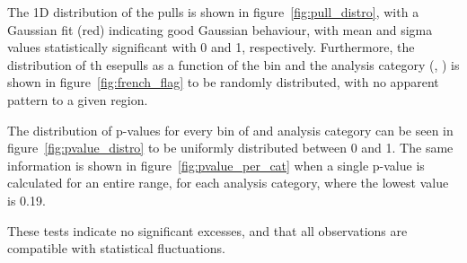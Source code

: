 The 1D distribution of the
pulls is shown in figure~\ref{fig:pull_distro}, with a Gaussian fit (red)
indicating good Gaussian behaviour, with mean and sigma values statistically
significant with 0 and 1, respectively. Furthermore, the distribution of th
esepulls as a function of the \HT bin and
the analysis category (\nb, \nj) is shown in figure~\ref{fig:french_flag} to be
randomly distributed, with no apparent pattern to a given region.

The distribution of p-values for every bin of \HT and analysis category can be
seen in figure~\ref{fig:pvalue_distro} to be uniformly distributed between 0
and 1. The same information is shown in figure~\ref{fig:pvalue_per_cat} when a
single p-value is calculated for an entire \HT range, for each analysis
category, where the lowest value is 0.19.

These tests indicate no significant excesses, and that all observations are
compatible with statistical fluctuations.





